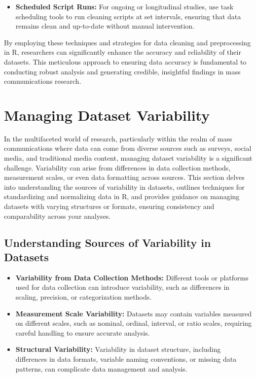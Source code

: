 \documentclass[
]{book}
\providecommand{\tightlist}{%
  \setlength{\itemsep}{0pt}\setlength{\parskip}{0pt}}
\begin{document}
\begin{itemize}
\tightlist
\item
  \textbf{Scheduled Script Runs:} For ongoing or longitudinal studies, use task scheduling tools to run cleaning scripts at set intervals, ensuring that data remains clean and up-to-date without manual intervention.
\end{itemize}

By employing these techniques and strategies for data cleaning and preprocessing in R, researchers can significantly enhance the accuracy and reliability of their datasets. This meticulous approach to ensuring data accuracy is fundamental to conducting robust analysis and generating credible, insightful findings in mass communications research.

\hypertarget{managing-dataset-variability}{%
\section{Managing Dataset Variability}\label{managing-dataset-variability}}

In the multifaceted world of research, particularly within the realm of mass communications where data can come from diverse sources such as surveys, social media, and traditional media content, managing dataset variability is a significant challenge. Variability can arise from differences in data collection methods, measurement scales, or even data formatting across sources. This section delves into understanding the sources of variability in datasets, outlines techniques for standardizing and normalizing data in R, and provides guidance on managing datasets with varying structures or formats, ensuring consistency and comparability across your analyses.

\hypertarget{understanding-sources-of-variability-in-datasets}{%
\subsection*{Understanding Sources of Variability in Datasets}\label{understanding-sources-of-variability-in-datasets}}

\begin{itemize}
\item
  \textbf{Variability from Data Collection Methods:} Different tools or platforms used for data collection can introduce variability, such as differences in scaling, precision, or categorization methods.
\item
  \textbf{Measurement Scale Variability:} Datasets may contain variables measured on different scales, such as nominal, ordinal, interval, or ratio scales, requiring careful handling to ensure accurate analysis.
\item
  \textbf{Structural Variability:} Variability in dataset structure, including differences in data formats, variable naming conventions, or missing data patterns, can complicate data management and analysis.
\end{itemize}
\end{document}
